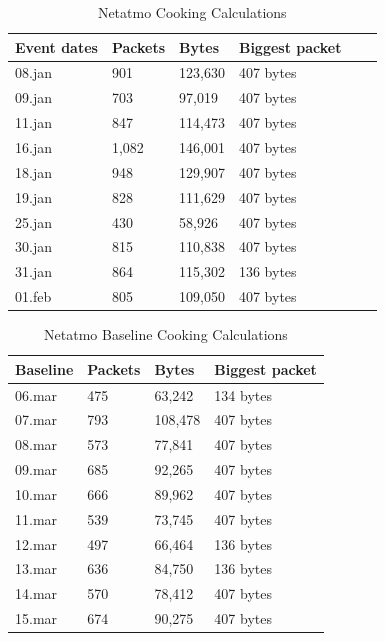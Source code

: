 \begin{table}[!ht]
    \centering
    \caption{Netatmo Cooking Calculations}
    \begin{tabular}{|l|l|l|l|l|l|}
    \hline
        \textbf{Event dates} & \textbf{Packets} & \textbf{Bytes} & \textbf{Biggest packet} \\ \hline
        08.jan & 901 & 123,630 & 407 bytes\\ \hline
        09.jan & 703 & 97,019 & 407 bytes \\ \hline
        11.jan & 847 & 114,473 & 407 bytes\\ \hline
        16.jan & 1,082 & 146,001 & 407 bytes\\ \hline
        18.jan & 948 & 129,907 & 407 bytes\\ \hline
        19.jan & 828 & 111,629 & 407 bytes \\ \hline
        25.jan & 430 & 58,926 & 407 bytes \\ \hline
        30.jan & 815 & 110,838 & 407 bytes \\ \hline
        31.jan & 864 & 115,302 & 136 bytes \\ \hline
        01.feb & 805 & 109,050 & 407 bytes \\ \hline
    \end{tabular}
    \label{tab:NetatmoCookingCalculations}
\end{table}

\begin{table}[!ht]
    \centering
    \caption{Netatmo Baseline Cooking Calculations}
    \begin{tabular}{|l|l|l|l|}
    \hline
        \textbf{Baseline} & \textbf{Packets} & \textbf{Bytes} & \textbf{Biggest packet} \\ \hline
        06.mar & 475 & 63,242 & 134 bytes\\ \hline
        07.mar & 793 & 108,478 & 407 bytes\\ \hline
        08.mar & 573 & 77,841 & 407 bytes \\ \hline
        09.mar & 685 & 92,265 & 407 bytes \\ \hline
        10.mar & 666 & 89,962 & 407 bytes \\ \hline
        11.mar & 539 & 73,745 & 407 bytes \\ \hline
        12.mar & 497 & 66,464 & 136 bytes \\ \hline
        13.mar & 636 & 84,750 & 136 bytes \\ \hline
        14.mar & 570 & 78,412 & 407 bytes \\ \hline
        15.mar & 674 & 90,275 & 407 bytes \\ \hline
    \end{tabular}
    \label{tab:NetatmoBaselineCookingCalculations}
\end{table}


